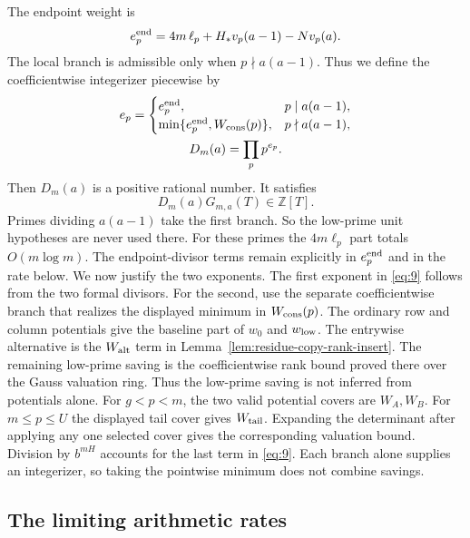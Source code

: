 The endpoint weight is
\[
 e_p^{\rm end}=4m\,\ell_p+H_*v_p(a-1)-Nv_p(a).
\]
The local branch is
admissible only when $p\nmid a(a-1)$. Thus we define the coefficientwise
integerizer piecewise by
\begin{equation}
\begin{gathered}
 e_p=\begin{cases}
 e_p^{\rm end},&p\mid a(a-1),\\
 \min\{e_p^{\rm end},W_{\rm cons}(p)\},&p\nmid a(a-1),
 \end{cases}\\
 D_m(a)=\prod_p p^{e_p}.
\end{gathered}                                               \label{eq:9}
\end{equation}
Then $D_m(a)$ is a positive rational number. It satisfies
\begin{equation}
 D_m(a)G_{m,a}(T)\in\mathbb Z[T].                          \label{eq:10}
\end{equation}
Primes dividing $a(a-1)$ take the first branch. So the low-prime unit
hypotheses are never used there. For these primes the $4m\ell_p$ part totals
$O(m\log m)$. The endpoint-divisor terms remain explicitly in
$e_p^{\rm end}$ and in the rate below. We now justify the two exponents. The first
exponent in \eqref{eq:9} follows from the two formal divisors.
For the second, use the separate coefficientwise branch that realizes the
displayed minimum in $W_{\rm cons}(p)$. The ordinary row and column
potentials give the baseline part of $w_0$ and $w_{\rm low}$. The entrywise
alternative is the $W_{\rm alt}$ term in Lemma~\ref{lem:residue-copy-rank-insert}.
The remaining low-prime saving is the coefficientwise rank bound proved
there over the Gauss valuation ring. Thus the low-prime saving is not inferred
from potentials alone. For $g<p<m$, the two valid potential covers are
$W_A,W_B$. For $m\le p\le U$ the displayed tail cover gives
$W_{\rm tail}$. Expanding the determinant after applying any one selected
cover gives the corresponding valuation bound. Division by $b^{mH}$ accounts
for the last term in \eqref{eq:9}. Each branch alone supplies an integerizer,
so taking the pointwise minimum does not combine savings.

\subsection{The limiting arithmetic rates}

